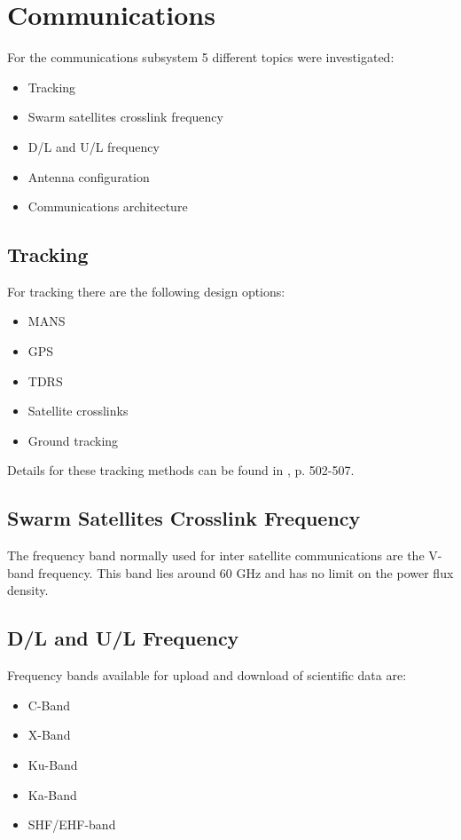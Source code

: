 \section{Communications}
\label{designOptionsCommunications}

For the communications subsystem 5 different topics were investigated:
\begin{itemize}
\item Tracking
\item Swarm satellites crosslink frequency
\item D/L and U/L frequency
\item Antenna configuration
\item Communications architecture
\end{itemize}

\subsection{Tracking}
For tracking there are the following design options:
\begin {itemize}
\item \ac{MANS}
\item \acs{GPS}
\item \ac{TDRS}
\item Satellite crosslinks
\item Ground tracking
\end {itemize}

Details for these tracking methods can be found in \cite{larson}, p. 502-507.

\subsection{Swarm Satellites Crosslink Frequency}
The frequency band normally used for inter satellite communications are the V-band frequency. This band lies around 60 GHz and has no limit on the power flux density.

\subsection{D/L and U/L Frequency}
Frequency bands available for upload and download of scientific data are:
\begin{itemize}
\item C-Band
\item X-Band
\item Ku-Band
\item Ka-Band
\item SHF/EHF-band
\end{itemize}

